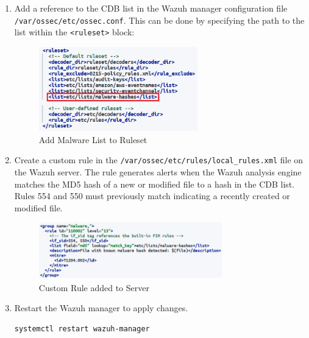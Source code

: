 \begin{enumerate}
    \item Add a reference to the CDB list in the Wazuh manager configuration file \texttt{/var/ossec/etc/ossec.conf}. This can be done by specifying the path to the list within the \texttt{<ruleset>} block:
    \begin{figure}[H]
        \centering
        \includegraphics[width=0.65\textwidth]{images/malware-detection/cdb/3.png}
        \caption{Add Malware List to Ruleset}
        \label{fig:malware-list-ruleset}
    \end{figure}
    
    \item Create a custom rule in the \texttt{/var/ossec/etc/rules/local\_rules.xml} file on the Wazuh server. The rule generates alerts when the Wazuh analysis engine matches the MD5 hash of a new or modified file to a hash in the CDB list. Rules 554 and 550 must previously match indicating a recently created or modified file.
    \begin{figure}[H]
        \centering
        \includegraphics[width=0.75\textwidth]{images/malware-detection/cdb/4.png}
        \caption{Custom Rule added to Server}
        \label{fig:cdb-custom-rule}
    \end{figure}
    \item Restart the Wazuh manager to apply changes.
    \begin{verbatim}
systemctl restart wazuh-manager
    \end{verbatim}
\end{enumerate}

